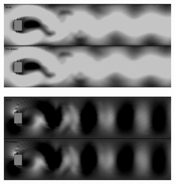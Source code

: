 \documentclass{llncs}
\begin{document}
\begin{figure}
  \begin{subfigure}{.5\textwidth}
    \centering
    \includegraphics[width=1\linewidth]{imgs/x_recursive_0_speed_8}
  \end{subfigure}
  \begin{subfigure}{.5\textwidth}
    \centering
    \includegraphics[width=1\linewidth]{imgs/y_recursive_0_speed_8}
  \end{subfigure}


\end{figure}
\end{document}
